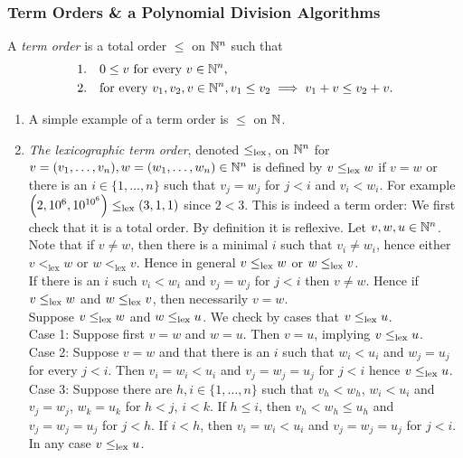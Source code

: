 \subsubsection{Term Orders \& a Polynomial Division Algorithms}

\begin{definition}
    A \textit{term order} is a total order $\leq$ on $\mathbb{N}^n$ such that 
    \begin{align*}
        &1. \quad 0\leq v \text{ for every } v\in \mathbb{N}^n,\\
        &2. \quad \text{for every } v_1,v_2,v\in \mathbb{N}^n, v_1\leq v_2\implies v_1+v\leq v_2+v.
    \end{align*}
\end{definition}
\begin{example}
    \begin{enumerate}
        \item A simple example of a term order is $\leq$ on $\mathbb{N}$. 
        \item \textit{The lexicographic term order}, denoted $\leq_{\text{lex}}$, on $\mathbb{N}^n$ for $v=(v_1,\dots,v_n),w=(w_1,\dots,w_n)\in \mathbb{N}^n$ is defined by $v\leq_{\text{lex}} w$ if $v=w$ or there is an $i\in \{1,\dots,n\}$ such that $v_j = w_j$ for $j<i$ and $v_i < w_i$. For example $\left(2,10^6,10^{10^6}\right)\leq_{\text{lex}} (3,1,1)$ since $2<3$. This is indeed a term order: We first check that it is a total order. By definition it is reflexive. Let $v,w,u\in \mathbb{N}^n$.\\
        Note that if $v \neq w$, then there is a minimal $i$ such that $v_i \neq w_i$, hence either $v <_\text{lex} w$ or $w <_\text{lex} v$. Hence in general $v\leq_{\text{lex}} w$ or $w\leq_{\text{lex}} v$.\\ 
        If there is an $i$ such $v_i < w_i$ and $v_j=w_j$ for $j<i$ then $v\neq w$. Hence if $v\leq_{\text{lex}} w$ and $w\leq_{\text{lex}} v$, then necessarily $v=w$.\\
        Suppose $v\leq_{\text{lex}} w$ and $w\leq_{\text{lex}} u$. We check by cases that $v \leq_{\text{lex}} u$.\\
        Case 1: Suppose first $v = w$ and $w = u$. Then $v=u$, implying $v\leq_{\text{lex}} u$.\\
        Case 2: Suppose $v=w$ and that there is an $i$ such that $w_i<u_i$ and $w_j=u_j$ for every $j<i$. Then $v_i = w_i < u_i$ and $v_j = w_j = u_j$ for $j<i$ hence $v \leq_{\text{lex}} u$.\\
        Case 3: Suppose there are $h,i\in \{1,\dots,n\}$ such that $v_h < w_h$, $w_i <u_i$ and $v_j=w_j$, $w_k = u_k$ for $h<j$, $i<k$. If $h\leq i$, then $v_h < w_h \leq u_h$ and $v_j = w_j = u_j$ for $j<h$. If $i< h$, then $v_i = w_i < u_i $ and $v_j=w_j=u_j$ for $j<i$. In any case $v\leq_{\text{lex}} u$.\\

\end{enumerate}
\end{example}
